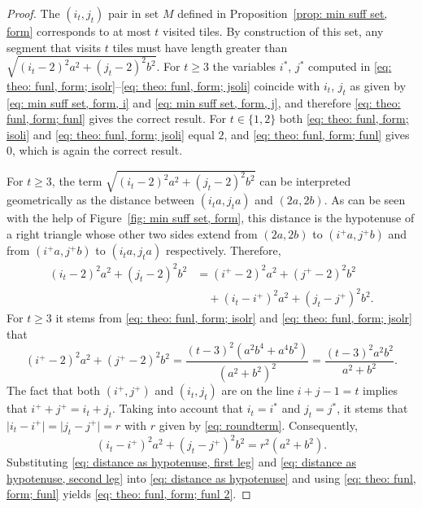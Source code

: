 \documentclass[12pt, a4paper]{article}
\newcommand{\tiles}{t} %
\newcommand{\isolr}{i^+}
\newcommand{\jsolr}{j^+}
\newcommand{\isoli}{i^\ast}
\newcommand{\jsoli}{j^\ast}
\newcommand{\roundterm}{r}
\newcommand{\mss}{M}
\begin{document}
\begin{proof}
The $(i_\tiles,j_\tiles)$ pair in set $\mss$ defined in Proposition~\ref{prop: min suff set, form} corresponds to at most $\tiles$ visited tiles. By construction of this set, any segment that visits $\tiles$ tiles must have length greater than $\sqrt{(i_\tiles-2)^2a^2 + (j_\tiles-2)^2b^2}$. For $\tiles \geq 3$ the variables $\isoli$, $\jsoli$ computed in \eqref{eq: theo: funl, form; isolr}--\eqref{eq: theo: funl, form; jsoli}
coincide with $i_\tiles$, $j_\tiles$ as given by \eqref{eq: min suff set, form, i} and \eqref{eq: min suff set, form, j}, and therefore \eqref{eq: theo: funl, form; funl} gives the correct result. For $\tiles \in \{1, 2\}$ both \eqref{eq: theo: funl, form; isoli} and \eqref{eq: theo: funl, form; jsoli} equal $2$, and \eqref{eq: theo: funl, form; funl} gives $0$, which is again the correct result.

For $\tiles \geq 3$, the term $\sqrt{(i_\tiles-2)^2a^2 + (j_\tiles-2)^2b^2}$ can be interpreted geometrically as the distance between $(i_\tiles a, j_\tiles a)$ and $(2a, 2b)$. As can be seen with the help of Figure~\ref{fig: min suff set, form}, this distance is the hypotenuse of a right triangle whose other two sides extend from $(2a, 2b)$ to $(\isolr a, \jsolr b)$ and from $(\isolr a, \jsolr b)$ to $(i_\tiles a, j_\tiles a)$ respectively. Therefore,
\begin{equation}
\label{eq: distance as hypotenuse}
\begin{split}
(i_\tiles-2)^2a^2 + (j_\tiles-2)^2b^2 &= (\isolr-2)^2a^2 + (\jsolr-2)^2b^2 \\
&\quad + (i_\tiles-\isolr)^2a^2 + (j_\tiles-\jsolr)^2b^2.
\end{split}
\end{equation}
For $\tiles \geq 3$ it stems from \eqref{eq: theo: funl, form; isolr}
and \eqref{eq: theo: funl, form; jsolr} that
\begin{equation}
\label{eq: distance as hypotenuse, first leg}
(\isolr-2)^2a^2 + (\jsolr-2)^2b^2 =
\frac{(\tiles-3)^2 (a^2b^4+a^4b^2)}{(a^2+b^2)^2} =
\frac{(\tiles-3)^2 a^2b^2}{a^2+b^2}.
\end{equation}
The fact that both $(\isolr, \jsolr)$ and $(i_\tiles, j_\tiles)$ are on the line $i+j-1=\tiles$ implies that $\isolr+\jsolr = i_\tiles+ j_\tiles$. Taking into account that $i_\tiles=\isoli$ and $j_\tiles=\jsoli$, it stems that $\vert i_\tiles-\isolr \vert = \vert j_\tiles-\jsolr \vert = \roundterm$ with $\roundterm$ given by \eqref{eq: roundterm}. Consequently,
\begin{equation}
\label{eq: distance as hypotenuse, second leg}
(i_\tiles-\isolr)^2a^2 + (j_\tiles-\jsolr)^2b^2 = \roundterm^2 (a^2+b^2).
\end{equation}
Substituting \eqref{eq: distance as hypotenuse, first leg} and \eqref{eq: distance as hypotenuse, second leg} into \eqref{eq: distance as hypotenuse} and using \eqref{eq: theo: funl, form; funl} yields \eqref{eq: theo: funl, form; funl 2}.


\end{proof}
\end{document}
